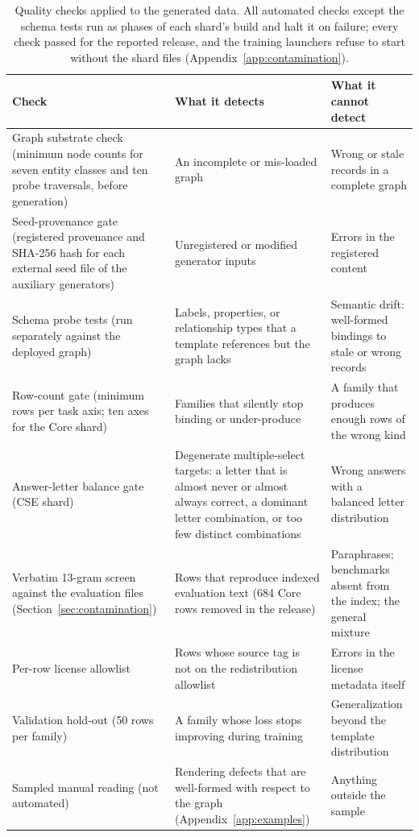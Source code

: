 \documentclass[twocolumn]{svjour3}
\begin{document}
\begin{table}
\centering\footnotesize
\caption{Quality checks applied to the generated data. All automated checks except the schema tests run as phases of each shard's build and halt it on failure; every check passed for the reported release, and the training launchers refuse to start without the shard files (Appendix~\ref{app:contamination}).}\label{tab:gates}
\begin{tabularx}{\textwidth}{@{}P{4.2cm}XX@{}}
\toprule Check & What it detects & What it cannot detect \\\midrule
Graph substrate check (minimum node counts for seven entity classes and ten probe traversals, before generation) & An incomplete or mis-loaded graph & Wrong or stale records in a complete graph \\
Seed-provenance gate (registered provenance and SHA-256 hash for each external seed file of the auxiliary generators) & Unregistered or modified generator inputs & Errors in the registered content \\
Schema probe tests (run separately against the deployed graph) & Labels, properties, or relationship types that a template references but the graph lacks & Semantic drift: well-formed bindings to stale or wrong records \\
Row-count gate (minimum rows per task axis; ten axes for the Core shard) & Families that silently stop binding or under-produce & A family that produces enough rows of the wrong kind \\
Answer-letter balance gate (CSE shard) & Degenerate multiple-select targets: a letter that is almost never or almost always correct, a dominant letter combination, or too few distinct combinations & Wrong answers with a balanced letter distribution \\
Verbatim 13-gram screen against the evaluation files (Section~\ref{sec:contamination}) & Rows that reproduce indexed evaluation text (684 Core rows removed in the release) & Paraphrases; benchmarks absent from the index; the general mixture \\
Per-row license allowlist & Rows whose source tag is not on the redistribution allowlist & Errors in the license metadata itself \\
Validation hold-out (50 rows per family) & A family whose loss stops improving during training & Generalization beyond the template distribution \\
Sampled manual reading (not automated) & Rendering defects that are well-formed with respect to the graph (Appendix~\ref{app:examples}) & Anything outside the sample \\\bottomrule
\end{tabularx}
\end{table}
\end{document}
